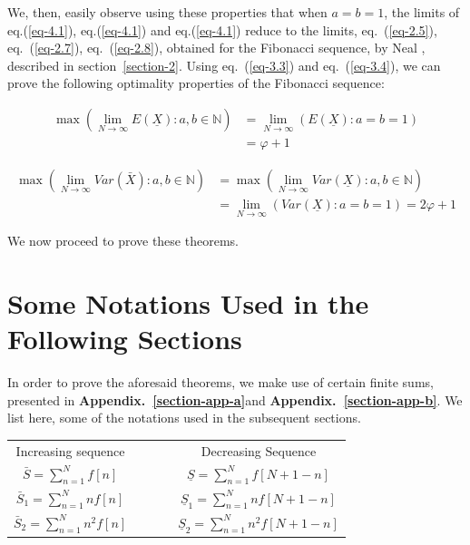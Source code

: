 \begin{multicols}{2}
We, then, easily observe using these properties that when $a = b = 1$, the limits of eq.(\ref{eq-4.1}), eq.(\ref{eq-4.1}) and eq.(\ref{eq-4.1}) reduce to the limits, eq.~(\ref{eq-2.5}), eq.~(\ref{eq-2.7}), eq.~(\ref{eq-2.8}), obtained for the Fibonacci sequence, by Neal \cite{art1-key01}, described in section~\ref{section-2}. Using eq.~(\ref{eq-3.3}) and eq.~(\ref{eq-3.4}), we can prove the following optimality properties of the Fibonacci sequence:
\begin{thm}
 \label{thm-4.5}
\begin{align*}
\max{\left(\lim_{N\rightarrow \infty} E(\underline{X}): a, b \in \mathbb N \right)} &= \lim_{N \rightarrow \infty}\left(E(\underline{X}):a=b=1\right)\\
 &= \varphi + 1
\end{align*}
\end{thm}
\begin{thm}
\label{thm-4.6}
{\fontsize{7.3}{8.3}\selectfont\begin{align*}
\max{\left (\lim_{N\rightarrow \infty}Var(\bar{X}): a,b \in \mathbb N\right)} &=\max{\left(\lim_{N\rightarrow \infty}Var(\underline{X}): a,b \in \mathbb N\right)}\\
&= \lim_{N \rightarrow \infty}\left(Var(\underline{X}):a=b=1\right)= 2\varphi + 1
\end{align*}}
 \end{thm}

\vspace{-.5cm}

We now proceed to prove these theorems.

\vspace{-.5cm}

\section{Some Notations Used in the\\ Following Sections}\label{section-5}
In order to prove the aforesaid theorems, we make use of certain finite sums, presented in \textbf{Appendix.~\ref{section-app-a}}\break and \textbf{Appendix.~\ref{section-app-b}}. We list here, some of the notations used in the subsequent sections.

\begin{tabular}{cccc}
  Increasing sequence & ~ &~& Decreasing Sequence\\[.2cm]
 $\bar{S} = \displaystyle{\sum_{n=1}^{N}}f[n]$& ~ &~& $\underline{S} = \displaystyle{\sum_{n=1}^{N}}f[N+1-n]$ \\
 $\bar{S}_1 = \displaystyle{\sum_{n=1}^{N}}n f[n]$ & ~ &~& $\underline{S}_1 = \displaystyle{\sum_{n=1}^{N}}n f[N+1-n]$ \\
 $\bar{S}_2 = \displaystyle{\sum_{n=1}^{N}}n^2 f[n]$ &~& ~&$\underline{S}_2 = \displaystyle{\sum_{n=1}^{N}}n^2 f[N+1-n]$ 
\end{tabular}


\end{multicols}
